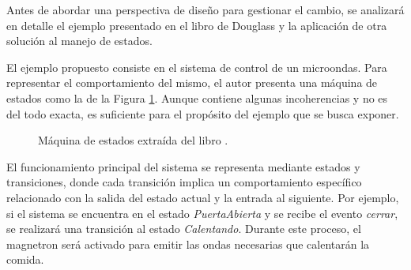 Antes de abordar una perspectiva de diseño para gestionar el cambio, se analizará en detalle el ejemplo presentado en el libro de Douglass \cite{douglass} y la aplicación de otra solución al manejo de estados.

El ejemplo propuesto consiste en el sistema de control de un microondas. Para representar el comportamiento del mismo, el autor presenta una máquina de estados como la de la Figura \ref{maquinaMicroondas}. Aunque contiene algunas incoherencias y no es del todo exacta, es suficiente para el propósito del ejemplo que se busca exponer.

\begin{figure}[h]
\caption{Máquina de estados extraída del libro \cite{douglass}.}
\label{maquinaMicroondas}
\begin{center}
\end{center}
\end{figure}

El funcionamiento principal del sistema se representa mediante estados y transiciones, donde cada transición implica un comportamiento específico relacionado con la salida del estado actual y la entrada al siguiente. Por ejemplo, si el sistema se encuentra en el estado \textit{PuertaAbierta} y se recibe el evento \textit{cerrar}, se realizará una transición al estado \textit{Calentando}. Durante este proceso, el \gls{magnetron} será activado para emitir las ondas necesarias que calentarán la comida.

